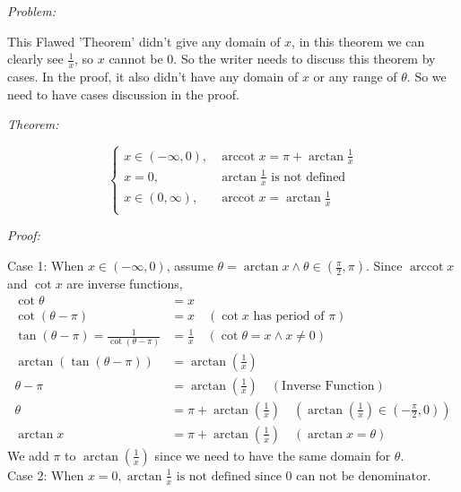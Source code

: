 \documentclass[12pt]{exam}
\newcommand{\vv}{\vspace{.1cm}}
\DeclareMathOperator{\arccot}{arccot}
\begin{document}
\begin{enumerate}
\begin{enumerate}
	\vv
	
	\emph{Problem:}
	
	\vv
	
	This Flawed 'Theorem' didn't give any domain of $x$, in this theorem we can clearly see $\frac{1}{x}$, so $x$ cannot be 0. So the writer needs to discuss this theorem by cases. In the proof, it also didn't have any domain of $x$ or any range of $\theta.$ So we need to have cases discussion in the proof.
	
	\vv
	
	\emph{Theorem:}
	
	\vv
	$$
	\begin{cases}
	    x\in(-\infty, 0),&\arccot x=\pi+\arctan\frac{1}{x}\\
	    x=0,&\arctan\frac{1}{x} \mbox{ is not defined}\\
	    x\in(0, \infty),&\arccot x=\arctan\frac{1}{x}\\
	\end{cases}
	$$
	\vv
	
	\emph{Proof:}
	
	\vv
	
	Case 1: When $x\in(-\infty, 0)$, assume $\theta=\arctan x \land \theta \in(\frac{\pi}{2},\pi).$ Since $\arccot x$ and $\cot x$ are inverse functions,
	\begin{align*}
	    \cot\theta&=x\\
	    \cot(\theta-\pi)&=x\quad(\cot x\mbox{ has period of }\pi)\\
	    \tan(\theta-\pi)=\frac{1}{\cot(\theta-\pi)}&=\frac{1}{x}\quad(\cot\theta=x\land x\neq0)\\
	    \arctan(\tan(\theta-\pi))&=\arctan(\frac{1}{x})\\
	    \theta-\pi&=\arctan(\frac{1}{x})\quad(\mbox{Inverse Function})\\
	    \theta&=\pi+\arctan(\frac{1}{x})\quad(\arctan(\frac{1}{x})\in(-\frac{\pi}{2},0))\\
	    \arctan x&=\pi+\arctan(\frac{1}{x})\quad(\arctan x=\theta)
	\end{align*}
	We add $\pi$ to $\arctan(\frac{1}{x})$ since we need to have the same domain for $\theta$.\\
	
	Case 2: When $x=0,\arctan\frac{1}{x} \mbox{ is not defined since 0 can not be denominator.}$\\
	

\end{enumerate}
\end{enumerate}
\end{document}
